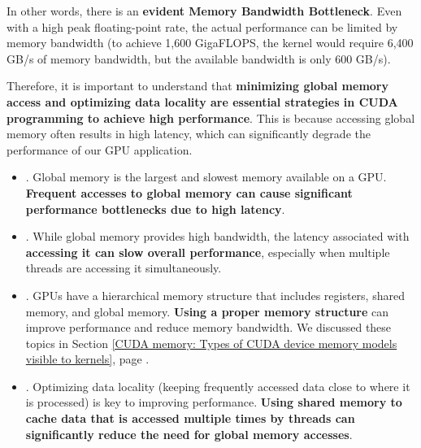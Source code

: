 \highspace
In other words, there is an \textbf{evident Memory Bandwidth Bottleneck}. Even with a high peak floating-point rate, the actual performance can be limited by memory bandwidth (to achieve 1,600 GigaFLOPS, the kernel would require 6,400 GB/s of memory bandwidth, but the available bandwidth is only 600 GB/s).

\newpage

\noindent
Therefore, it is important to understand that \textbf{minimizing global memory access and optimizing data locality are essential strategies in CUDA programming to achieve high performance}. This is because accessing global memory often results in high latency, which can significantly degrade the performance of our GPU application.
\begin{itemize}
    \item {}. Global memory is the largest and slowest memory available on a GPU. \textbf{Frequent accesses to global memory can cause significant performance bottlenecks due to high latency}.

    \item {}. While global memory provides high bandwidth, the latency associated with \textbf{accessing it can slow overall performance}, especially when multiple threads are accessing it simultaneously.

    \item {}. GPUs have a hierarchical memory structure that includes registers, shared memory, and global memory. \textbf{Using a proper memory structure} can improve performance and reduce memory bandwidth. We discussed these topics in Section \ref{CUDA memory: Types of CUDA device memory models visible to kernels}, page \pageref{CUDA memory: Types of CUDA device memory models visible to kernels}.

    \item {}. Optimizing data locality (keeping frequently accessed data close to where it is processed) is key to improving performance. \textbf{Using shared memory to cache data that is accessed multiple times by threads can significantly reduce the need for global memory accesses}.
\end{itemize}

